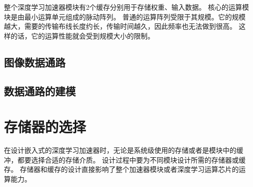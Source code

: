 整个深度学习加速器模块有2个缓存分别用于存储权重、输入数据。
核心的运算模块是由最小运算单元组成的脉动阵列。
普通的运算阵列受限于其规模。它的规模越大，需要的传输布线长度约长，传输时间越久，因此频率也无法做到很高。
这样的话，它的运算性能就会受到规模大小的限制。



\subsection{图像数据通路}


\subsection{数据通路的建模}



\section{存储器的选择}
在设计嵌入式的深度学习加速器时，无论是系统级使用的存储或者是模块中的缓冲，都要选择合适的存储介质。
设计过程中要为不同模块设计所需的存储器或缓存。
存储器和缓存的设计直接影响了整个加速器模块或者深度学习运算芯片的运算能力。



